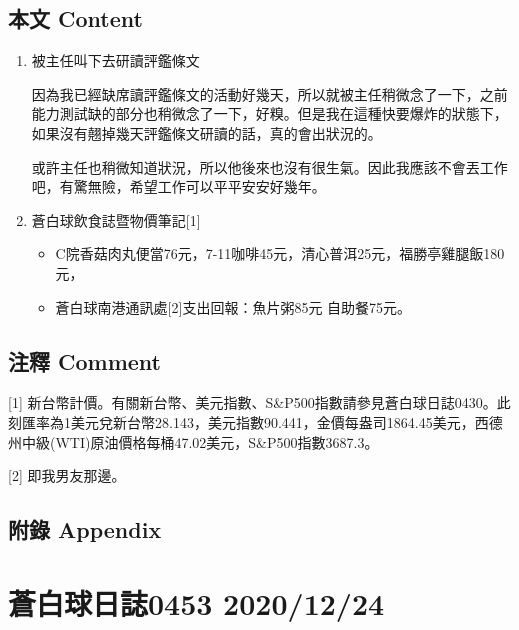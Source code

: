 \documentclass[
]{article}
\providecommand{\tightlist}{%
  \setlength{\itemsep}{0pt}\setlength{\parskip}{0pt}}
\begin{document}
\hypertarget{ux672cux6587-content-22}{%
\subsection{本文 Content}\label{ux672cux6587-content-22}}

\begin{enumerate}
\def\labelenumi{\arabic{enumi}.}
\item
  被主任叫下去研讀評鑑條文

  因為我已經缺席讀評鑑條文的活動好幾天，所以就被主任稍微念了一下，之前能力測試缺的部分也稍微念了一下，好糗。但是我在這種快要爆炸的狀態下，如果沒有翹掉幾天評鑑條文研讀的話，真的會出狀況的。

  或許主任也稍微知道狀況，所以他後來也沒有很生氣。因此我應該不會丟工作吧，有驚無險，希望工作可以平平安安好幾年。
\item
  蒼白球飲食誌暨物價筆記{[}1{]}

  \begin{itemize}
  \tightlist
  \item
    C院香菇肉丸便當76元，7-11咖啡45元，清心普洱25元，福勝亭雞腿飯180元，
  \item
    蒼白球南港通訊處{[}2{]}支出回報：魚片粥85元 自助餐75元。
  \end{itemize}
\end{enumerate}

\hypertarget{ux6ce8ux91cb-comment-22}{%
\subsection{注釋 Comment}\label{ux6ce8ux91cb-comment-22}}

{[}1{]}
新台幣計價。有關新台幣、美元指數、S\&P500指數請參見蒼白球日誌0430。此刻匯率為1美元兌新台幣28.143，美元指數90.441，金價每盎司1864.45美元，西德州中級(WTI)原油價格每桶47.02美元，S\&P500指數3687.3。

{[}2{]} 即我男友那邊。

\hypertarget{ux9644ux9304-appendix-22}{%
\subsection{附錄 Appendix}\label{ux9644ux9304-appendix-22}}

\hypertarget{ux84bcux767dux7403ux65e5ux8a8c0453-20201224}{%
\section{蒼白球日誌0453
2020/12/24}\label{ux84bcux767dux7403ux65e5ux8a8c0453-20201224}}
\end{document}
